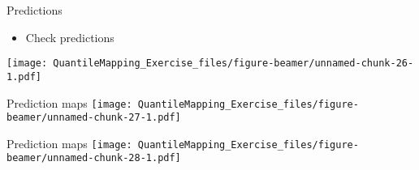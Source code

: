 \documentclass[
  ignorenonframetext,
]{beamer}
\providecommand{\tightlist}{%
  \setlength{\itemsep}{0pt}\setlength{\parskip}{0pt}}
\begin{document}
\begin{frame}{Predictions}
\protect\hypertarget{predictions-2}{}
\begin{itemize}
\tightlist
\item
  Check predictions
\end{itemize}

\texttt{[image: QuantileMapping\_Exercise\_files/figure-beamer/unnamed-chunk-26-1.pdf]}
\end{frame}

\begin{frame}{Prediction maps}
\protect\hypertarget{prediction-maps}{}
\texttt{[image: QuantileMapping\_Exercise\_files/figure-beamer/unnamed-chunk-27-1.pdf]}
\end{frame}

\begin{frame}{Prediction maps}
\protect\hypertarget{prediction-maps-1}{}
\texttt{[image: QuantileMapping\_Exercise\_files/figure-beamer/unnamed-chunk-28-1.pdf]}
\end{frame}
\end{document}
